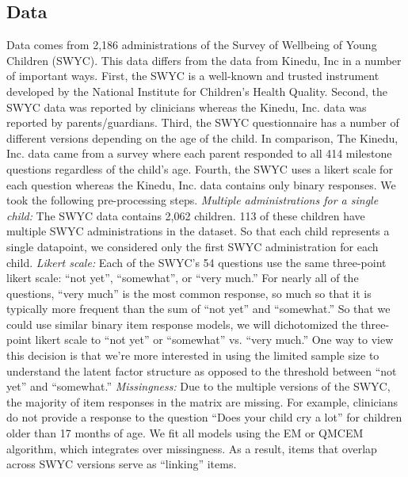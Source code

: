 \documentclass{article}
\begin{document}
\subsection*{Data}
Data comes from 2,186 administrations of the Survey of Wellbeing of Young Children (SWYC). This data differs from the data from Kinedu, Inc in a number of important ways. First, the SWYC is a well-known and trusted instrument developed by the National Institute for Children’s Health Quality. Second, the SWYC data was reported by clinicians whereas the Kinedu, Inc. data was reported by parents/guardians. Third, the SWYC questionnaire has a number of different versions depending on the age of the child. In comparison, The Kinedu, Inc. data came from a survey where each parent responded to all 414 milestone questions regardless of the child’s age. Fourth, the SWYC uses a likert scale for each question whereas the Kinedu, Inc. data contains only binary responses. We took the following pre-processing steps.
\textit{Multiple administrations for a single child:} The SWYC data contains 2,062 children. 113 of these children have multiple SWYC administrations in the dataset. So that each child represents a single datapoint, we considered only the first SWYC administration for each child.
\textit{Likert scale:} Each of the SWYC's 54 questions use the same three-point likert scale: “not yet”, “somewhat”, or “very much.” For nearly all of the questions, “very much” is the most common response, so much so that it is typically more frequent than the sum of “not yet” and “somewhat.” So that we could use similar binary item response models, we will dichotomized the three-point likert scale to “not yet” or “somewhat” vs. “very much.” One way to view this decision is that we’re more interested in using the limited sample size to understand the latent factor structure as opposed to the threshold between “not yet” and “somewhat.”
\textit{Missingness:} Due to the multiple versions of the SWYC, the majority of item responses in the matrix are missing. For example, clinicians do not provide a response to the question “Does your child cry a lot” for children older than 17 months of age. We fit all models using the EM or QMCEM algorithm, which integrates over missingness. As a result, items that overlap across SWYC versions serve as “linking” items.
\end{document}
